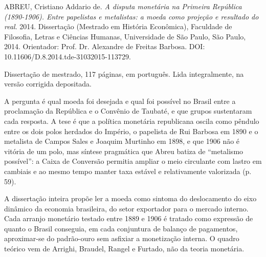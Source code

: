 
\begin{identificacao}
ABREU, Cristiano Addario de. \emph{A disputa monetária na Primeira República
(1890-1906). Entre papelistas e metalistas: a moeda como projeção e resultado do
real}. 2014. Dissertação (Mestrado em História Econômica), Faculdade de
Filosofia, Letras e Ciências Humanas, Universidade de São Paulo, São Paulo, 2014.
Orientador: Prof. Dr. Alexandre de Freitas Barbosa. DOI:
10.11606/D.8.2014.tde-31032015-113729.

Dissertação de mestrado, 117 páginas, em português. Lida integralmente, na versão
corrigida depositada.
\end{identificacao}

A pergunta é qual moeda foi desejada e qual foi possível no Brasil entre a
proclamação da República e o Convênio de Taubaté, e que grupos sustentaram cada
resposta. A tese é que a política monetária republicana oscila como pêndulo entre
os dois polos herdados do Império, o papelista de Rui Barbosa em 1890 e o
metalista de Campos Sales e Joaquim Murtinho em 1898, e que 1906 não é vitória de
um polo, mas síntese pragmática que Abreu batiza de ``metalismo possível'': a
Caixa de Conversão permitia ampliar o meio circulante com lastro em cambiais e ao
mesmo tempo manter taxa estável e relativamente valorizada (p. 59).

A dissertação inteira propõe ler a moeda como sintoma do deslocamento do eixo
dinâmico da economia brasileira, do setor exportador para o mercado interno. Cada
arranjo monetário testado entre 1889 e 1906 é tratado como expressão de quanto o
Brasil conseguia, em cada conjuntura de balanço de pagamentos, aproximar-se do
padrão-ouro sem asfixiar a monetização interna. O quadro teórico vem de Arrighi,
Braudel, Rangel e Furtado, não da teoria monetária.

